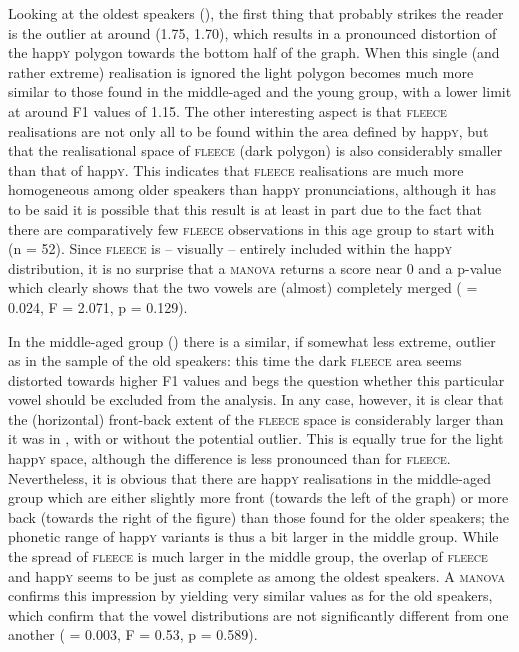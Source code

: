 Looking at the oldest speakers (), the first thing that probably strikes the reader is the outlier at around (1.75, 1.70), which results in a pronounced distortion of the happ\textsc{y} polygon towards the bottom half of the graph.
When this single (and rather extreme) realisation is ignored the light polygon becomes much more similar to those found in the middle-aged and the young group, with a lower limit at around F1 values of 1.15.
The other interesting aspect is that \textsc{fleece} realisations are not only all to be found within the area defined by happ\textsc{y}, but that the realisational space of \textsc{fleece} (dark polygon) is also considerably smaller than that of happ\textsc{y}.
This indicates that \textsc{fleece} realisations are much more homogeneous among older speakers than happ\textsc{y} pronunciations, although it has to be said it is possible that this result is at least in part due to the fact that there are comparatively few \textsc{fleece} observations in this age group to start with (n = 52).
Since \textsc{fleece} is -- visually -- entirely included within the happ\textsc{y} distribution, it is no surprise that a \textsc{manova} returns a  score near 0 and a p-value which clearly shows that the two vowels are (almost) completely merged ( = 0.024, F = 2.071, p = 0.129).

In the middle-aged group () there is a similar, if somewhat less extreme, outlier as in the sample of the old speakers: this time the dark \textsc{fleece} area seems distorted towards higher F1 values and begs the question whether this particular vowel should be excluded from the analysis.
In any case, however, it is clear that the (horizontal) front-back extent of the \textsc{fleece} space is considerably larger than it was in , with or without the potential outlier.
This is equally true for the light happ\textsc{y} space, although the difference is less pronounced than for \textsc{fleece}.
Nevertheless, it is obvious that there are happ\textsc{y} realisations in the middle-aged group which are either slightly more front (towards the left of the graph) or more back (towards the right of the figure) than those found for the older speakers; the phonetic range of happ\textsc{y} variants is thus a bit larger in the middle group.
While the spread of \textsc{fleece} is much larger in the middle group, the overlap of \textsc{fleece} and happ\textsc{y} seems to be just as complete as among the oldest speakers.
A \textsc{manova} confirms this impression by yielding very similar values as for the old speakers, which confirm that the vowel distributions are not significantly different from one another ( = 0.003, F = 0.53, p = 0.589).

